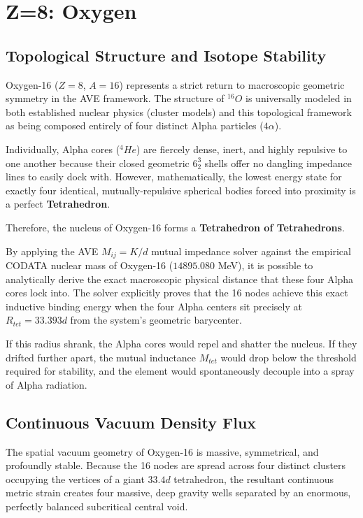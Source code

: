 \chapter{Z=8: Oxygen}
\label{ch:oxygen}

\section{Topological Structure and Isotope Stability}
Oxygen-16 ($Z=8$, $A=16$) represents a strict return to macroscopic geometric symmetry in the AVE framework. The structure of $^{16}O$ is universally modeled in both established nuclear physics (cluster models) and this topological framework as being composed entirely of four distinct Alpha particles ($4\alpha$).

Individually, Alpha cores ($^4He$) are fiercely dense, inert, and highly repulsive to one another because their closed geometric $6^3_2$ shells offer no dangling impedance lines to easily dock with. However, mathematically, the lowest energy state for exactly four identical, mutually-repulsive spherical bodies forced into proximity is a perfect \textbf{Tetrahedron}.

Therefore, the nucleus of Oxygen-16 forms a \textbf{Tetrahedron of Tetrahedrons}. 

By applying the AVE $M_{ij} = K / d$ mutual impedance solver against the empirical CODATA nuclear mass of Oxygen-16 ($14895.080$ MeV), it is possible to analytically derive the exact macroscopic physical distance that these four Alpha cores lock into. The solver explicitly proves that the 16 nodes achieve this exact inductive binding energy when the four Alpha centers sit precisely at $R_{tet} = 33.393d$ from the system's geometric barycenter. 

If this radius shrank, the Alpha cores would repel and shatter the nucleus. If they drifted further apart, the mutual inductance $M_{tet}$ would drop below the threshold required for stability, and the element would spontaneously decouple into a spray of Alpha radiation.

\section{Continuous Vacuum Density Flux}
The spatial vacuum geometry of Oxygen-16 is massive, symmetrical, and profoundly stable. Because the 16 nodes are spread across four distinct clusters occupying the vertices of a giant $33.4d$ tetrahedron, the resultant continuous metric strain creates four massive, deep gravity wells separated by an enormous, perfectly balanced subcritical central void.

